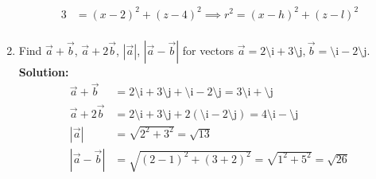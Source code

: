 \documentclass{article}[A4, 12pt]
\newcommand{\vi}{\text{\^\i}}
\newcommand{\vj}{\text{\^\j}}
\begin{document}
\begin{enumerate}
\begin{align*}
					3 &= (x - 2)^2 + (z - 4)^2 
						\implies r^2 = (x - h)^2 + (z - l)^2 \\
			\end{align*}
		\item
			Find $\vec{a} + \vec{b}$, $\vec{a} + 2\vec{b}$, $|\vec{a}|$, $|\vec{a} - \vec{b}|$ for vectors $\vec{a} = 2\vi + 3\vj, \vec{b} = \vi - 2\vj$. \\
			\textbf{Solution:}
			\begin{align*}
				\vec{a} + \vec{b} &= 2\vi + 3\vj + \vi - 2\vj = 3\vi + \vj \\
				\vec{a} + 2\vec{b} &= 2\vi + 3\vj + 2(\vi - 2\vj) = 4\vi -\vj \\
				|\vec{a}| &= \sqrt{2^2 + 3^2} = \sqrt{13} \\
				|\vec{a} - \vec{b}| &= \sqrt{(2 - 1)^2 + (3 + 2)^2} = \sqrt{1^2 + 5^2} = \sqrt{26}
			\end{align*}
	\end{enumerate}
\end{document}
